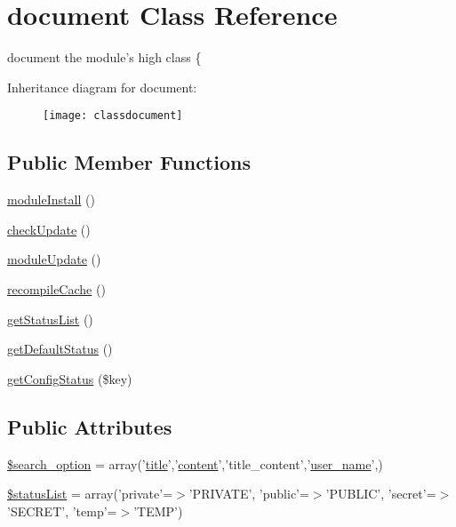 \hypertarget{classdocument}{\section{document Class Reference}
\label{classdocument}
}


document the module's high class \{  


Inheritance diagram for document\-:\begin{figure}[H]
\begin{center}
\leavevmode
\texttt{[image: classdocument]}
\end{center}
\end{figure}
\subsection*{Public Member Functions}
\begin{DoxyCompactItemize}
\item 
\hyperlink{classdocument_a712db6c7542d0ec2cfdde35583a3b7ba}{module\-Install} ()
\item 
\hyperlink{classdocument_a71d01592758989490b56cbd6a2a92e37}{check\-Update} ()
\item 
\hyperlink{classdocument_ad0568fe26b80e3bc328a3fae4997354c}{module\-Update} ()
\item 
\hyperlink{classdocument_ae08854265fa7f6cb8b792d5c1ab93dc2}{recompile\-Cache} ()
\item 
\hyperlink{classdocument_ae90cc64e28afdfa204844ed6d03b40e7}{get\-Status\-List} ()
\item 
\hyperlink{classdocument_aacc6b168cae9bf79d7a13d6f5bb4fdfb}{get\-Default\-Status} ()
\item 
\hyperlink{classdocument_a319eeb35de3ffef5cb32374283b7bf14}{get\-Config\-Status} (\$key)
\end{DoxyCompactItemize}
\subsection*{Public Attributes}
\begin{DoxyCompactItemize}
\item 
\hyperlink{classdocument_adfef00d8f028ef4dfe991de199009d46}{\$search\-\_\-option} = array('\hyperlink{ko_8install_8php_a5b072c5fd1d2228c6ba5cee13cd142e3}{title}','\hyperlink{classcontent}{content}','title\-\_\-content','\hyperlink{ko_8install_8php_a115401aff7da80e73c66e9f76505426b}{user\-\_\-name}',)
\item 
\hyperlink{classdocument_a93e1c85a4ec17a1471b874fdb14cce58}{\$status\-List} = array('private'=$>$'P\-R\-I\-V\-A\-T\-E', 'public'=$>$'P\-U\-B\-L\-I\-C', 'secret'=$>$'S\-E\-C\-R\-E\-T', 'temp'=$>$'T\-E\-M\-P')
\end{DoxyCompactItemize}


